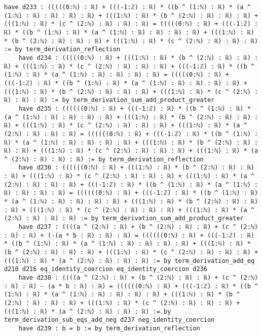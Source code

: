 \documentclass{article}
\begin{document}
\begin{tcolorbox}[colback=white!10, width=\linewidth]
\begin{lstlisting}[language=Lean4]
    have d233 : (((((0:ℕ) : ℝ) + (((-1:ℤ) : ℝ) * ((b ^ (1:ℕ) : ℝ) * (a ^ (1:ℕ) : ℝ) : ℝ) : ℝ) : ℝ) + (((1:ℕ) : ℝ) * (b ^ (2:ℕ) : ℝ) : ℝ) : ℝ) + (((1:ℕ) : ℝ) * (c ^ (2:ℕ) : ℝ) : ℝ) : ℝ) = (((((0:ℕ) : ℝ) + (((-1:ℤ) : ℝ) * ((b ^ (1:ℕ) : ℝ) * (a ^ (1:ℕ) : ℝ) : ℝ) : ℝ) : ℝ) + (((1:ℕ) : ℝ) * (b ^ (2:ℕ) : ℝ) : ℝ) : ℝ) + (((1:ℕ) : ℝ) * (c ^ (2:ℕ) : ℝ) : ℝ) : ℝ) := by term_derivation_reflection
    have d234 : (((((0:ℕ) : ℝ) + (((1:ℕ) : ℝ) * (b ^ (2:ℕ) : ℝ) : ℝ) : ℝ) + (((1:ℕ) : ℝ) * (c ^ (2:ℕ) : ℝ) : ℝ) : ℝ) + (((-1:ℤ) : ℝ) * ((b ^ (1:ℕ) : ℝ) * (a ^ (1:ℕ) : ℝ) : ℝ) : ℝ) : ℝ) = (((((0:ℕ) : ℝ) + (((-1:ℤ) : ℝ) * ((b ^ (1:ℕ) : ℝ) * (a ^ (1:ℕ) : ℝ) : ℝ) : ℝ) : ℝ) + (((1:ℕ) : ℝ) * (b ^ (2:ℕ) : ℝ) : ℝ) : ℝ) + (((1:ℕ) : ℝ) * (c ^ (2:ℕ) : ℝ) : ℝ) : ℝ) := by term_derivation_sum_add_product_greater
    have d235 : ((((((0:ℕ) : ℝ) + (((-1:ℤ) : ℝ) * ((b ^ (1:ℕ) : ℝ) * (a ^ (1:ℕ) : ℝ) : ℝ) : ℝ) : ℝ) + (((1:ℕ) : ℝ) * (b ^ (2:ℕ) : ℝ) : ℝ) : ℝ) + (((1:ℕ) : ℝ) * (c ^ (2:ℕ) : ℝ) : ℝ) : ℝ) + (((1:ℕ) : ℝ) * (a ^ (2:ℕ) : ℝ) : ℝ) : ℝ) = ((((((0:ℕ) : ℝ) + (((-1:ℤ) : ℝ) * ((b ^ (1:ℕ) : ℝ) * (a ^ (1:ℕ) : ℝ) : ℝ) : ℝ) : ℝ) + (((1:ℕ) : ℝ) * (b ^ (2:ℕ) : ℝ) : ℝ) : ℝ) + (((1:ℕ) : ℝ) * (c ^ (2:ℕ) : ℝ) : ℝ) : ℝ) + (((1:ℕ) : ℝ) * (a ^ (2:ℕ) : ℝ) : ℝ) : ℝ) := by term_derivation_reflection
    have d236 : ((((((0:ℕ) : ℝ) + (((1:ℕ) : ℝ) * (b ^ (2:ℕ) : ℝ) : ℝ) : ℝ) + (((1:ℕ) : ℝ) * (c ^ (2:ℕ) : ℝ) : ℝ) : ℝ) + (((1:ℕ) : ℝ) * (a ^ (2:ℕ) : ℝ) : ℝ) : ℝ) + (((-1:ℤ) : ℝ) * ((b ^ (1:ℕ) : ℝ) * (a ^ (1:ℕ) : ℝ) : ℝ) : ℝ) : ℝ) = ((((((0:ℕ) : ℝ) + (((-1:ℤ) : ℝ) * ((b ^ (1:ℕ) : ℝ) * (a ^ (1:ℕ) : ℝ) : ℝ) : ℝ) : ℝ) + (((1:ℕ) : ℝ) * (b ^ (2:ℕ) : ℝ) : ℝ) : ℝ) + (((1:ℕ) : ℝ) * (c ^ (2:ℕ) : ℝ) : ℝ) : ℝ) + (((1:ℕ) : ℝ) * (a ^ (2:ℕ) : ℝ) : ℝ) : ℝ) := by term_derivation_sum_add_product_greater
    have d237 : ((((a ^ (2:ℕ) : ℝ) + (b ^ (2:ℕ) : ℝ) : ℝ) + (c ^ (2:ℕ) : ℝ) : ℝ) + (-(a * b : ℝ) : ℝ) : ℝ) = ((((((0:ℕ) : ℝ) + (((-1:ℤ) : ℝ) * ((b ^ (1:ℕ) : ℝ) * (a ^ (1:ℕ) : ℝ) : ℝ) : ℝ) : ℝ) + (((1:ℕ) : ℝ) * (b ^ (2:ℕ) : ℝ) : ℝ) : ℝ) + (((1:ℕ) : ℝ) * (c ^ (2:ℕ) : ℝ) : ℝ) : ℝ) + (((1:ℕ) : ℝ) * (a ^ (2:ℕ) : ℝ) : ℝ) : ℝ) := by term_derivation_add_eq d210 d216 eq_identity_coercion eq_identity_coercion d236
    have d238 : ((((a ^ (2:ℕ) : ℝ) + (b ^ (2:ℕ) : ℝ) : ℝ) + (c ^ (2:ℕ) : ℝ) : ℝ) - (a * b : ℝ) : ℝ) = ((((((0:ℕ) : ℝ) + (((-1:ℤ) : ℝ) * ((b ^ (1:ℕ) : ℝ) * (a ^ (1:ℕ) : ℝ) : ℝ) : ℝ) : ℝ) + (((1:ℕ) : ℝ) * (b ^ (2:ℕ) : ℝ) : ℝ) : ℝ) + (((1:ℕ) : ℝ) * (c ^ (2:ℕ) : ℝ) : ℝ) : ℝ) + (((1:ℕ) : ℝ) * (a ^ (2:ℕ) : ℝ) : ℝ) : ℝ) := by term_derivation_sub_eqs_add_neg d237 neg_identity_coercion
    have d239 : b = b := by term_derivation_reflection

\end{lstlisting}
\end{tcolorbox}
\end{document}
